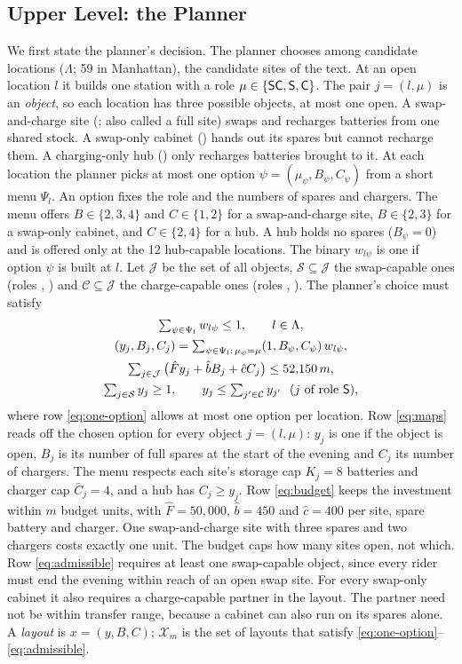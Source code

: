 \subsection{Upper Level: the Planner}\label{sec:model:upper}
We first state the planner's decision. The planner chooses among candidate locations ($\Lambda$; 59 in Manhattan), the candidate sites of the text. At an open location $l$ it builds one station with a role $\mu\in\{\textsf{SC},\textsf{S},\textsf{C}\}$. The pair $j=(l,\mu)$ is an \emph{object}, so each location has three possible objects, at most one open. A swap-and-charge site (\rSC; also called a full site) swaps and recharges batteries from one shared stock. A swap-only cabinet (\rS) hands out its spares but cannot recharge them. A charging-only hub (\rC) only recharges batteries brought to it. At each location the planner picks at most one option $\psi=(\mu_\psi,B_\psi,C_\psi)$ from a short menu $\Psi_l$. An option fixes the role and the numbers of spares and chargers. The menu offers $B\in\{2,3,4\}$ and $C\in\{1,2\}$ for a swap-and-charge site, $B\in\{2,3\}$ for a swap-only cabinet, and $C\in\{2,4\}$ for a hub. A hub holds no spares ($B_\psi=0$) and is offered only at the 12 hub-capable locations. The binary $w_{l\psi}$ is one if option $\psi$ is built at $l$. Let $\mathcal J$ be the set of all objects, $\mathcal S\subseteq\mathcal J$ the swap-capable ones (roles \rSC, \rS) and $\mathcal C\subseteq\mathcal J$ the charge-capable ones (roles \rSC, \rC). The planner's choice must satisfy
\begin{gather}
  \textstyle\sum_{\psi\in\Psi_l}w_{l\psi}\le1,\qquad l\in\Lambda,\label{eq:one-option}\\
  \textstyle (y_j,B_j,C_j)=\sum_{\psi\in\Psi_l:\,\mu_\psi=\mu}(1,B_\psi,C_\psi)\,w_{l\psi},\label{eq:maps}\\
  \textstyle\sum_{j\in\mathcal J}\big(\hat F y_j+\hat b B_j+\hat c C_j\big)\le 52{,}150\,m,\label{eq:budget}\\
  \textstyle\sum_{j\in\mathcal S}y_j\ge1,\qquad y_j\le\sum_{j'\in\mathcal C}y_{j'}\ \ (j\ \text{of role \textsf{S}}),\label{eq:admissible}
\end{gather}
where row \eqref{eq:one-option} allows at most one option per location. Row \eqref{eq:maps} reads off the chosen option for every object $j=(l,\mu)$: $y_j$ is one if the object is open, $B_j$ is its number of full spares at the start of the evening and $C_j$ its number of chargers. The menu respects each site's storage cap $K_j=8$ batteries and charger cap $\bar C_j=4$, and a hub has $C_j\ge y_j$. Row \eqref{eq:budget} keeps the investment within $m$ budget units, with $\hat F=50{,}000$, $\hat b=450$ and $\hat c=400$\usd{} per site, spare battery and charger. One swap-and-charge site with three spares and two chargers costs exactly one unit. The budget caps how many sites open, not which. Row \eqref{eq:admissible} requires at least one swap-capable object, since every rider must end the evening within reach of an open swap site. For every swap-only cabinet it also requires a charge-capable partner in the layout. The partner need not be within transfer range, because a cabinet can also run on its spares alone. A \emph{layout} is $x=(y,B,C)$; $\mathcal X_m$ is the set of layouts that satisfy \eqref{eq:one-option}--\eqref{eq:admissible}.
